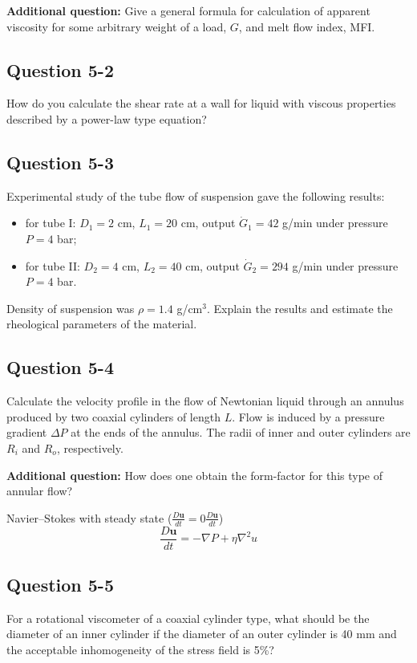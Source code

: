 \textbf{Additional question:} Give a general formula for calculation of apparent viscosity for some arbitrary weight of a load, $G$, and melt flow index, MFI.

\subsection*{Question 5-2}
How do you calculate the shear rate at a wall for liquid with viscous properties described by a power-law type equation?

\subsection*{Question 5-3}
Experimental study of the tube flow of suspension gave the following results:
\begin{itemize}
    \item for tube I: $D_1 = 2$ cm, $L_1 = 20$ cm, output $\dot{G}_1 = 42$ g/min under pressure $P = 4$ bar;
    \item for tube II: $D_2 = 4$ cm, $L_2 = 40$ cm, output $\dot{G}_2 = 294$ g/min under pressure $P = 4$ bar.
\end{itemize}
Density of suspension was $\rho = 1.4$ g/cm$^3$. Explain the results and estimate the rheological parameters of the material.

\subsection*{Question 5-4}
Calculate the velocity profile in the flow of Newtonian liquid through an annulus produced by two coaxial cylinders of length $L$. Flow is induced by a pressure gradient $\Delta P$ at the ends of the annulus. The radii of inner and outer cylinders are $R_i$ and $R_o$, respectively.

\textbf{Additional question:} How does one obtain the form-factor for this type of annular flow?

Navier--Stokes with steady state ($\frac{D\mathbf{u}}{dt}=0\frac{D\mathbf{u}}{dt}$)
\[
	\frac{D\mathbf{u}}{dt} = -\nabla P + \eta \nabla^2 u
\]

\subsection*{Question 5-5}
For a rotational viscometer of a coaxial cylinder type, what should be the diameter of an inner cylinder if the diameter of an outer cylinder is 40 mm and the acceptable inhomogeneity of the stress field is 5\%?

